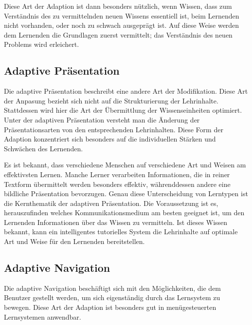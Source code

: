 Diese Art der Adaption ist dann besonders nützlich, wenn Wissen, dass zum Verständnis des zu vermittelnden neuen Wissens essentiell ist,
beim Lernenden nicht vorhanden, oder noch zu schwach ausgeprägt ist. Auf diese Weise werden dem Lernenden die Grundlagen
zuerst vermittelt; das Verständnis des neuen Problems wird erleichert.
\subsection{Adaptive Präsentation}
Die adaptive Präsentation beschreibt eine andere Art der Modifikation. Diese Art der Anpasung bezieht sich nicht auf die Strukturierung
der Lehrinhalte. Stattdessen wird hier die Art der Übermittlung der Wissenseinheiten optimiert.
Unter der adaptiven Präsentation versteht man die Änderung der Präsentationsarten von den entsprechenden Lehrinhalten.
Diese Form der Adaption konzentriert sich besonders auf die individuellen Stärken und Schwächen des Lernenden.

Es ist bekannt, dass verschiedene Menschen auf verschiedene Art und Weisen am effektivsten Lernen. Manche Lerner verarbeiten
Informationen, die in reiner Textform übermittelt werden besonders effektiv, währenddessen andere eine bildliche Präsentation bevorzugen.
Genau diese Unterscheidung von Lerntypen ist die Kernthematik der adaptiven Präsentation. Die Voraussetzung ist es, herauszufinden welches
Kommunikationsmedium am besten geeignet ist, um den Lernenden Informationen über das Wissen zu vermitteln.
Ist dieses Wissen bekannt, kann ein intelligentes tutorielles System die Lehrinhalte auf optimale Art und Weise für den Lernenden bereitstellen.

\subsection{Adaptive Navigation}
Die adaptive Navigation beschäftigt sich mit den Möglichkeiten, die dem Benutzer gestellt werden, um sich eigenständig
durch das Lernsystem zu bewegen. Diese Art der Adaption ist besonders gut in menügesteuerten Lernsystemen anwendbar.

